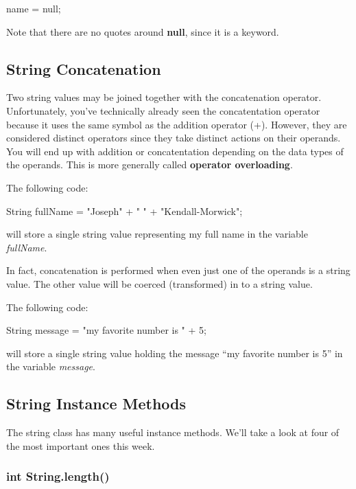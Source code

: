\begin{code}
name = null;
\end{code}

Note that there are no quotes around \textbf{null}, since it is a keyword. 


\subsection{String Concatenation}

Two string values may be joined together with the concatenation operator. Unfortunately, you've technically already seen the concatentation operator because it uses the same symbol as the addition operator (+). However, they are considered distinct operators since they take distinct actions on their operands. You will end up with addition or concatentation depending on the data types of the operands. This is more generally called \textbf{operator overloading}. 

\begin{exa}
The following code:
\begin{code}
String fullName = "Joseph" + " " + "Kendall-Morwick";
\end{code}
will store a single string value representing my full name in the variable \textit{fullName}.
\end{exa}

In fact, concatenation is performed when even just one of the operands is a string value. The other value will be coerced (transformed) in to a string value. 

\begin{exa}
The following code:
\begin{code}
String message = "my favorite number is " + 5;
\end{code}
will store a single string value holding the message ``my favorite number is 5'' in the variable \textit{message}.
\end{exa}


\subsection{String Instance Methods}

The string class has many useful instance methods. We'll take a look at four of the most important ones this week.


\subsubsection{int String.length()}

